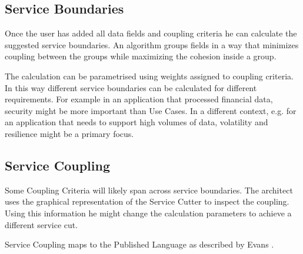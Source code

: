 
\subsection{Service Boundaries}

Once the user has added all data fields and coupling criteria he can calculate the suggested service boundaries. An algorithm groups fields in a way that minimizes coupling between the groups while maximizing the cohesion inside a group.

The calculation can be parametrised using weights assigned to coupling criteria. In this way different service boundaries can be calculated for different requirements. For example in an application that processed financial data, security might be more important than Use Cases. In a different context, e.g. for an application that needs to support high volumes of data, volatility and resilience might be a primary focus.

\subsection{Service Coupling}

Some Coupling Criteria will likely span across service boundaries. The architect uses the graphical representation of the Service Cutter to inspect the coupling. Using this information he might change the calculation parameters to achieve a different service cut.

Service Coupling maps to the Published Language as described by Evans \cite[p.375]{evans2003domain}.


